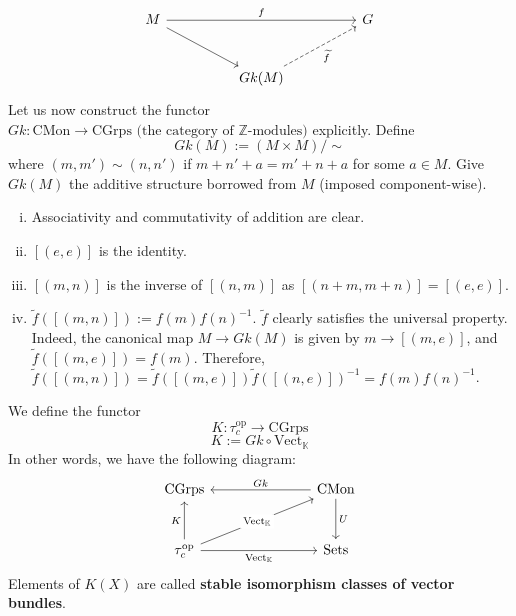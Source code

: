 \documentclass[11pt,a4paper]{article}
\begin{document}
\[\begin{tikzcd}[column sep=huge,row sep=large]
	M && G \\
	& {Gk(M)}
	\arrow["f", from=1-1, to=1-3]
	\arrow[from=1-1, to=2-2]
	\arrow["{\widetilde{f}}"', dashed, from=2-2, to=1-3]
\end{tikzcd}\]
Let us now construct the functor $Gk: \text{CMon} \rightarrow \text{CGrps} \text{ (the category of }\mathbb{Z}\text{-modules})$ explicitly. Define
$$Gk(M):= (M\times M)/\sim$$
where $(m, m') \sim (n,n')$ if $m+n'+a = m'+n+a$ for some $a\in M$. Give $Gk(M)$ the additive structure borrowed from $M$ (imposed component-wise).
\begin{enumerate}[(i)]
    \item Associativity and commutativity of addition are clear.
    \item $[(e, e)]$ is the identity.
    \item $[(m, n)]$ is the inverse of $[(n,m)]$ as $[(n+m, m+n)] = [(e, e)]$.
    \item $\widetilde{f}([(m,n)]):= f(m)f(n)^{-1}$. $\widetilde{f}$ clearly satisfies the universal property. Indeed, the canonical map $M\rightarrow Gk(M)$ is given by $m\rightarrow [(m, e)]$, and $\widetilde{f}([(m, e)]) = f(m)$. Therefore, $\widetilde{f}([(m, n)]) = \widetilde{f}([(m, e)])\widetilde{f}([(n, e)])^{-1} = f(m)f(n)^{-1}$.
\end{enumerate}

We define the functor
$$K: \tau_c^{\text{op}} \rightarrow \text{CGrps}$$
$$K:= Gk\circ \text{Vect}_{\mathbb{K}}$$
In other words, we have the following diagram:
\[\begin{tikzcd}[column sep=large,row sep=large]
	{\text{CGrps}} && {\text{CMon}} \\
	{\tau_c^{\text{op}}} && {\text{Sets}}
	\arrow["{\text{Vect}_{\mathbb{K}}}"{description}, from=2-1, to=1-3]
	\arrow["{\text{Vect}_{\mathbb{K}}}"', from=2-1, to=2-3]
	\arrow["U", from=1-3, to=2-3]
	\arrow["Gk"', from=1-3, to=1-1]
	\arrow["K", from=2-1, to=1-1]
\end{tikzcd}\]
Elements of $K(X)$ are called \textbf{stable isomorphism classes of vector bundles}.
\end{document}
